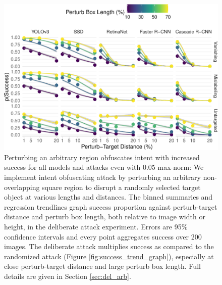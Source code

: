 \begin{figure}[tb]

{\centering \includegraphics[width=1\linewidth]{imgs/arbitrary_trend_graph-1} 

}

\caption{Perturbing an arbitrary region obfuscates intent with increased success for all models and attacks even with 0.05 max-norm:  We implement intent obfuscating attack by perturbing an arbitrary non-overlapping square region to disrupt a randomly selected target object at various lengths and distances. The binned summaries and regression trendlines graph success proportion against perturb-target distance and perturb box length, both relative to image width or height, in the deliberate attack experiment. Errors are 95\% confidence intervals and every point aggregates success over 200 images. The deliberate attack multiplies success as compared to the randomized attack (Figure \ref{fig:success_trend_graph}), especially at close perturb-target distance and large perturb box length. Full details are given in Section \ref{sec:del_arb}.}\label{fig:arbitrary_trend_graph}
\end{figure}

\begingroup\fontsize{9}{11}\selectfont

